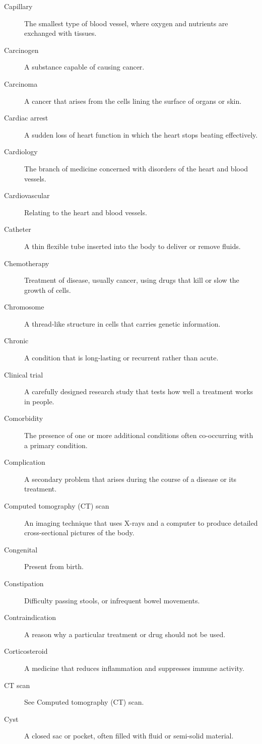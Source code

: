 \documentclass[12pt,oneside]{book}
\begin{document}
\begin{description}
  \item[Capillary] The smallest type of blood vessel, where oxygen and nutrients are exchanged with tissues.
  \item[Carcinogen] A substance capable of causing cancer.
  \item[Carcinoma] A cancer that arises from the cells lining the surface of organs or skin.
  \item[Cardiac arrest] A sudden loss of heart function in which the heart stops beating effectively.
  \item[Cardiology] The branch of medicine concerned with disorders of the heart and blood vessels.
  \item[Cardiovascular] Relating to the heart and blood vessels.
  \item[Catheter] A thin flexible tube inserted into the body to deliver or remove fluids.
  \item[Chemotherapy] Treatment of disease, usually cancer, using drugs that kill or slow the growth of cells.
  \item[Chromosome] A thread-like structure in cells that carries genetic information.
  \item[Chronic] A condition that is long-lasting or recurrent rather than acute.
  \item[Clinical trial] A carefully designed research study that tests how well a treatment works in people.
  \item[Comorbidity] The presence of one or more additional conditions often co-occurring with a primary condition.
  \item[Complication] A secondary problem that arises during the course of a disease or its treatment.
  \item[Computed tomography (CT) scan] An imaging technique that uses X-rays and a computer to produce detailed cross-sectional pictures of the body.
  \item[Congenital] Present from birth.
  \item[Constipation] Difficulty passing stools, or infrequent bowel movements.
  \item[Contraindication] A reason why a particular treatment or drug should not be used.
  \item[Corticosteroid] A medicine that reduces inflammation and suppresses immune activity.
  \item[CT scan] See Computed tomography (CT) scan.
  \item[Cyst] A closed sac or pocket, often filled with fluid or semi-solid material.

\end{description}
\end{document}
